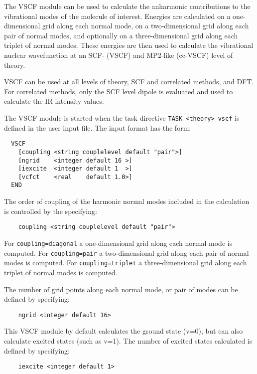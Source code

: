 %
%
\label{sec:vscf}

The VSCF module can be used to calculate the anharmonic contributions to the 
vibrational modes of the molecule of interest. Energies are calculated on a 
one-dimensional grid along each normal mode, on a two-dimensional grid along
each pair of normal modes, and optionally on a three-dimensional grid along
each triplet of normal modes. These energies are then used to calculate the
vibrational nuclear wavefunction at an SCF- (VSCF) and MP2-like (cc-VSCF) level
of theory. 

VSCF can be used at all levels of theory, SCF and correlated methods, and DFT.  
For correlated methods, only the SCF level dipole is evaluated and used to 
calculate the IR intensity values. 

The VSCF module is started when the task directive
\verb+TASK <theory> vscf+ is defined in the user input file. The input 
format has the form:

\begin{verbatim}
  VSCF
    [coupling <string couplelevel default "pair">]
    [ngrid    <integer default 16 >]
    [iexcite  <integer default 1  >]
    [vcfct    <real    default 1.0>]
  END
\end{verbatim}

The order of coupling of the harmonic normal modes included in the calculation
is controlled by the specifying:

\begin{verbatim}
    coupling <string couplelevel default "pair">
\end{verbatim}

For \verb+coupling=diagonal+ a one-dimensional grid along each normal mode is computed.
For \verb+coupling=pair+ a two-dimensional grid along each pair of normal modes is computed.
For \verb+coupling=triplet+ a three-dimensional grid along each triplet of normal modes is computed.

The number of grid points along each normal mode, or pair of modes can be defined 
by specifying:

\begin{verbatim}
    ngrid <integer default 16>
\end{verbatim}

This VSCF module by default calculates the ground state (v=0), but can also calculate excited
states (such as v=1). The number of excited states calculated is defined by specifying:

\begin{verbatim}
    iexcite <integer default 1>
\end{verbatim}

